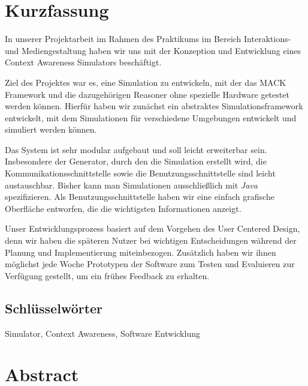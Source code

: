 \documentclass[11pt,    %
  english,ngerman,      %
  paper=a4,             %
  oneside,              %
  tablecaptionbelow,    %
  DIV=calc              %
  ]{scrbook}            %
\begin{document}
\chapter*{Kurzfassung}
\thispagestyle{empty}

In unserer Projektarbeit im Rahmen des Praktikums im Bereich Interaktions- und Mediengestaltung haben wir uns mit der Konzeption und Entwicklung eines Context Awareness Simulators beschäftigt.

Ziel des Projektes war es, eine Simulation zu entwickeln, mit der das MACK Framework und die dazugehörigen Reasoner ohne spezielle Hardware getestet werden können. Hierfür haben wir zunächst ein abstraktes Simulationsframework entwickelt, mit dem Simulationen für verschiedene Umgebungen entwickelt und simuliert werden können.

Das System ist sehr modular aufgebaut und soll leicht erweiterbar sein. Insbesondere der Generator, durch den die Simulation erstellt wird, die Kommunikationsschnittstelle sowie die Benutzungsschnittstelle sind leicht austauschbar. Bisher kann man Simulationen ausschließlich mit \textit{Java} spezifizieren. Als Benutzungsschnittstelle haben wir eine einfach grafische Oberfläche entworfen, die die wichtigsten Informationen anzeigt.

Unser Entwicklungsprozess basiert auf dem Vorgehen des User Centered Design, denn wir haben die späteren Nutzer bei wichtigen Entscheidungen während der Planung und Implementierung miteinbezogen. Zusätzlich haben wir ihnen möglichst jede Woche Prototypen der Software zum Testen und Evaluieren zur Verfügung gestellt, um ein frühes Feedback zu erhalten.

\vfill

\section*{Schlüsselwörter} Simulator, Context Awareness, Software Entwicklung


\chapter*{Abstract}
\thispagestyle{empty}
\end{document}
